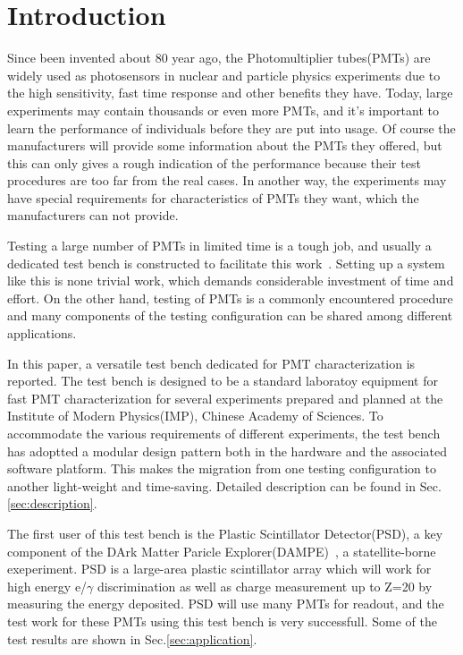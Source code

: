 \documentclass[5p, times]{elsarticle}
\begin{document}
\section{Introduction}
\label{sec:introduction}

Since been invented about 80 year ago, the Photomultiplier tubes(PMTs) are widely used as photosensors in nuclear and particle physics experiments due to the high sensitivity, fast time response and other benefits they have. Today, large experiments may contain thousands or even more PMTs, and it's important to learn the performance of individuals before they are put into usage. 
Of course the manufacturers will provide some information about the PMTs they offered, but this can only gives a rough indication of the performance because their test procedures are too far from the real cases. In another way, the experiments may have special requirements for characteristics of PMTs they want, which the manufacturers can not provide. 

Testing a large number of PMTs in limited time is a tough job, and usually a dedicated test bench is constructed to facilitate this work~\cite{barnhill_testing_2008,akgun_complete_2005,adragna_pmt-block_2006}.
Setting up a system like this is none trivial work, which demands considerable investment of time and effort.
On the other hand, testing of PMTs is a commonly encountered procedure and many components of the testing configuration can be shared among different applications.

In this paper, a versatile test bench dedicated for PMT characterization is reported.
The test bench is designed to be a standard laboratoy equipment for fast PMT characterization for several experiments prepared and planned at the Institute of Modern Physics(IMP), Chinese Academy of Sciences.
To accommodate the various requirements of different experiments, the test bench has adoptted a modular design pattern both in the hardware and the associated software platform.
This makes the migration from one testing configuration to another light-weight and time-saving.
Detailed description can be found in Sec.\ref{sec:description}.

The first user of this test bench is the Plastic Scintillator Detector(PSD), a key component of the DArk Matter Paricle Explorer(DAMPE)~\cite{Chang_Jin_dampe}, a statellite-borne exeperiment. 
PSD is a large-area plastic scintillator array which will work for high energy e/$\gamma$ discrimination as well as charge measurement up to Z=20 by measuring the energy deposited.
PSD will use many PMTs for readout, and the test work for these PMTs using this test bench is very successfull. Some of the test results are shown in Sec.\ref{sec:application}.
\end{document}
